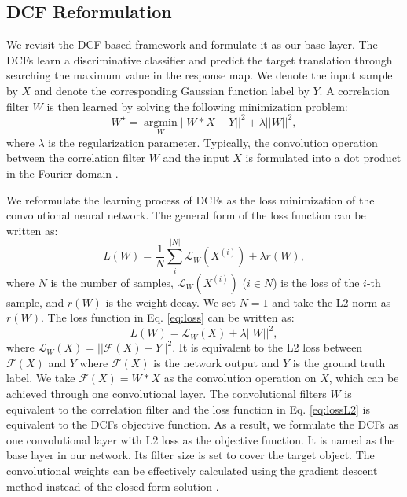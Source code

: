 \documentclass[10pt,twocolumn,letterpaper]{article}
\begin{document}
\subsection{DCF Reformulation}\label{sec:base}
We revisit the DCF based framework and formulate it as our base layer.
%
The DCFs learn a discriminative classifier and predict the target translation through searching the maximum value in the response map. We denote the input sample by $X$ and denote the corresponding Gaussian function label by $Y$. A correlation filter $W$ is then learned by solving the following minimization problem:
\begin{equation}
W^\star=\mathop{\arg\min}\limits_{W}||W\ast X-Y||^2+\lambda||W||^2,
\label{eq:dcf}
\end{equation}
where $\lambda$ is the regularization parameter. Typically, the convolution operation between the correlation filter $W$ and the input $X$ is formulated into a dot product in the Fourier domain \cite{Henriques-eccv12-DCF,ma-cvpr15-lct,henriques-pami15-high}.

We reformulate the learning process of DCFs as the loss minimization of the convolutional neural network. The general form of the loss function \cite{jia-arxiv14-caffe} can be written as:
\begin{equation}
L(W)=\frac{1}{N}\sum_i^{|N|}\mathcal{L}_W(X^{(i)})+\lambda r(W),
\label{eq:loss}
\end{equation}
where $N$ is the number of samples, $\mathcal{L}_W(X^{(i)})$ ($i\in N$) is the loss of the $i$-th sample, and $r(W)$ is the weight decay. We set $N=1$ and take the L2 norm as $r(W)$. The loss function in Eq. \ref{eq:loss} can be written as:
\begin{equation}
L(W)=\mathcal{L}_W(X)+\lambda||W||^2,
\label{eq:lossL2}
\end{equation}
where $\mathcal{L}_W(X)=||\mathcal{F}(X)-Y||^2$. It is equivalent to the L2 loss between $\mathcal{F}(X)$ and $Y$ where $\mathcal{F}(X)$ is the network output and $Y$ is the ground truth label. We take $\mathcal{F}(X)=W\ast X$ as the convolution operation on $X$, which can be achieved through one convolutional layer. The convolutional filters $W$ is equivalent to the correlation filter and the loss function in Eq. \ref{eq:lossL2} is equivalent to the DCFs objective function. As a result, we formulate the DCFs as one convolutional layer with L2 loss as the objective function. It is named as the base layer in our network. Its filter size is set to cover the target object. The convolutional weights can be effectively calculated using the gradient descent method instead of the closed form solution \cite{henriques-pami15-high}.
\end{document}
